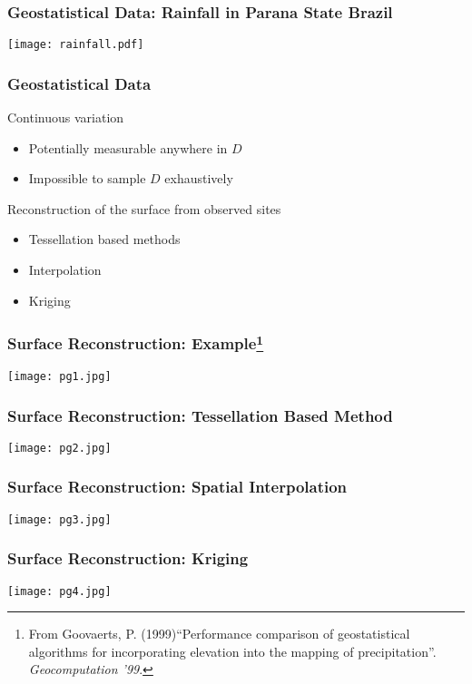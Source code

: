 \documentclass[nototal,handout]{beamer}
\begin{document}
 \begin{frame}
   \frametitle{Geostatistical Data: Rainfall in Parana State Brazil}
   \begin{center}
     \texttt{[image: rainfall.pdf]}
   \end{center}
 \end{frame}
 \begin{frame}[<+->]
   \frametitle{Geostatistical Data}
   \begin{block}{Continuous variation}
     \begin{itemize}
       \item Potentially measurable anywhere in $D$
       \item Impossible to sample $D$ exhaustively
     \end{itemize}
    \end{block}
\begin{block}{Reconstruction of the surface from observed sites}
     \begin{itemize}
       \item Tessellation based methods
       \item Interpolation
       \item Kriging
     \end{itemize}
    \end{block}
  \end{frame}
  \begin{frame}
    \frametitle{Surface Reconstruction: Example\footnote{From Goovaerts, P.
    (1999)``Performance comparison of geostatistical algorithms for
    incorporating elevation into the mapping of precipitation''.
    \emph{Geocomputation '99}.}}
    \begin{center}
      \texttt{[image: pg1.jpg]}
    \end{center}
  \end{frame}
\begin{frame}
    \frametitle{Surface Reconstruction: Tessellation Based Method}
    \begin{center}
      \texttt{[image: pg2.jpg]}
    \end{center}
  \end{frame}
\begin{frame}
    \frametitle{Surface Reconstruction: Spatial Interpolation}
    \begin{center}
      \texttt{[image: pg3.jpg]}
    \end{center}
  \end{frame}
\begin{frame}
    \frametitle{Surface Reconstruction: Kriging}
    \begin{center}
      \texttt{[image: pg4.jpg]}
    \end{center}
  \end{frame}
\end{document}
